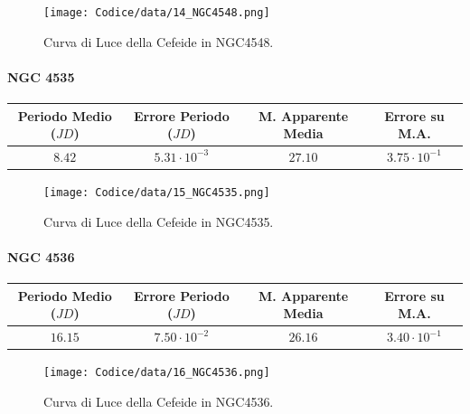 \documentclass{article}
\newcommand{\e}[1]{\cdot 10^{#1}} %
\begin{document}
\begin{figure}[H]
  \centering
  \texttt{[image: Codice/data/14\_NGC4548.png]}
  \caption{Curva di Luce della Cefeide in NGC4548.}
\end{figure}

\paragraph{NGC 4535}
\begin{center}
  \begin{tabular}{cccc}
  \toprule
  Periodo Medio ($JD$) & Errore Periodo ($JD$) & M. Apparente Media &
                                                                  Errore
                                                                      su
                                                                      M.A. \\
  \midrule
  $8.42$ & $5.31\e{-3}$ & $27.10$ & $3.75\e{-1}$ \\
  \bottomrule
 \end{tabular}
\end{center}

\begin{figure}[H]
  \centering
  \texttt{[image: Codice/data/15\_NGC4535.png]}
  \caption{Curva di Luce della Cefeide in NGC4535.}
\end{figure}

\paragraph{NGC 4536}
\begin{center}
  \begin{tabular}{cccc}
  \toprule
  Periodo Medio ($JD$) & Errore Periodo ($JD$) & M. Apparente Media &
                                                                  Errore
                                                                      su
                                                                      M.A. \\
  \midrule
  $16.15$ & $7.50\e{-2}$ & $26.16$ & $3.40\e{-1}$ \\
  \bottomrule
 \end{tabular}
\end{center}

\begin{figure}[H]
  \centering
  \texttt{[image: Codice/data/16\_NGC4536.png]}
  \caption{Curva di Luce della Cefeide in NGC4536.}
\end{figure}
\end{document}
